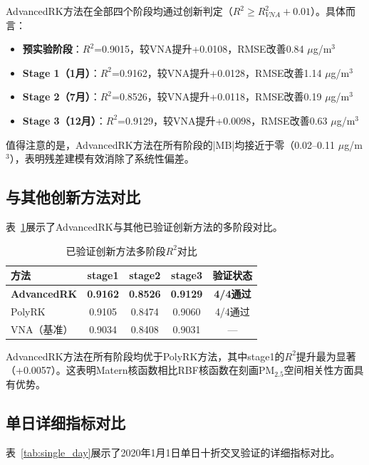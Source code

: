 \documentclass[UTF8, a4paper, 12pt]{article}
\begin{document}
AdvancedRK方法在全部四个阶段均通过创新判定（$R^2 \geq R^2_{VNA} + 0.01$）。具体而言：
\begin{itemize}
    \item \textbf{预实验阶段}：$R^2$=0.9015，较VNA提升+0.0108，RMSE改善0.84 $\mu$g/m$^3$
    \item \textbf{Stage 1（1月）}：$R^2$=0.9162，较VNA提升+0.0128，RMSE改善1.14 $\mu$g/m$^3$
    \item \textbf{Stage 2（7月）}：$R^2$=0.8526，较VNA提升+0.0118，RMSE改善0.19 $\mu$g/m$^3$
    \item \textbf{Stage 3（12月）}：$R^2$=0.9129，较VNA提升+0.0098，RMSE改善0.63 $\mu$g/m$^3$
\end{itemize}

值得注意的是，AdvancedRK方法在所有阶段的|MB|均接近于零（0.02--0.11 $\mu$g/m$^3$），表明残差建模有效消除了系统性偏差。

\subsection{与其他创新方法对比}

表~\ref{tab:method_compare}展示了AdvancedRK与其他已验证创新方法的多阶段对比。

\begin{table}[H]
\centering
\caption{已验证创新方法多阶段$R^2$对比}
\label{tab:method_compare}
\begin{tabular}{@{}lcccc@{}}
\toprule
方法 & stage1 & stage2 & stage3 & 验证状态 \\
\midrule
\textbf{AdvancedRK} & \textbf{0.9162} & \textbf{0.8526} & \textbf{0.9129} & \textbf{4/4通过} \\
PolyRK & 0.9105 & 0.8474 & 0.9060 & 4/4通过 \\
VNA（基准） & 0.9034 & 0.8408 & 0.9031 & --- \\
\bottomrule
\end{tabular}
\end{table}

AdvancedRK方法在所有阶段均优于PolyRK方法，其中stage1的$R^2$提升最为显著（+0.0057）。这表明Matern核函数相比RBF核函数在刻画PM$_{2.5}$空间相关性方面具有优势。

\subsection{单日详细指标对比}

表~\ref{tab:single_day}展示了2020年1月1日单日十折交叉验证的详细指标对比。
\end{document}
